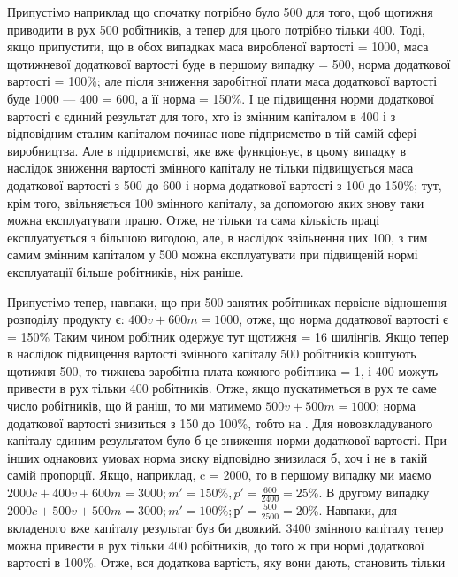 
Припустімо наприклад що спочатку потрібно було 500 для того, щоб щотижня приводити в рух 500 робітників, а тепер для цього потрібно тільки
400.
Тоді, якщо припустити, що в обох випадках маса виробленої
вартості = 1000, маса щотижневої додаткової вартості буде в першому випадку = 500, норма додаткової вартості  = 100\%; але після зниження заробітної плати
маса додаткової вартості буде 1000 — 400 = 600, а її норма  = 150\%. І це підвищення норми додаткової вартості є єдиний результат
для того, хто із змінним капіталом в 400 і з відповідним сталим капіталом починає
нове підприємство в тій самій сфері виробництва. Але в підприємстві, яке вже функціонує, в цьому
випадку в наслідок зниження вартості змінного
капіталу не тільки підвищується маса додаткової вартості з 500
до 600 і норма додаткової вартості з 100
до 150\%; тут, крім того, звільняється 100
змінного капіталу, за допомогою яких знову таки можна експлуатувати працю. Отже, не тільки та сама
кількість праці експлуатується з більшою вигодою, але, в наслідок звільнення цих 100, з тим самим змінним капіталом у 500 можна експлуатувати при підвищеній
нормі експлуатації більше робітників, ніж раніше.

Припустімо тепер, навпаки, що при 500 занятих робітниках
первісне відношення розподілу продукту є: $400 v + 600 m = 1000$, отже, що норма додаткової вартості є
= 150\% Таким
чином робітник одержує тут щотижня  = 16 шилінгів. Якщо тепер в наслідок
підвищення вартості
змінного капіталу 500 робітників коштують щотижня 500, то тижнева заробітна плата кожного робітника = 1, і 400 можуть привести
в рух тільки 400 робітників. Отже, якщо пускатиметься в рух те
саме число робітників, що й раніш, то ми матимемо $500 v + 500 m = 1000$; норма додаткової вартості
знизиться з 150 до 100\%,
тобто на . Для нововкладуваного капіталу єдиним результатом було б це зниження норми додаткової
вартості. При інших
однакових умовах норма зиску відповідно знизилася б, хоч і не
в такій самій пропорції. Якщо, наприклад, c = 2000, то в
першому випадку ми маємо $2000 c + 400 v + 600 m = 3000; m' = 150\%, p' = \frac{600}{2400} = 25\%$. В другому
випадку $2000 c + 500 v + 500 m = 3000; m' = 100\%; р' = \frac{500}{2500} = 20\%$. Навпаки, для вкладеного вже
капіталу результат був би двоякий. 3400 змінного капіталу тепер можна привести в рух тільки
400 робітників, до того ж при нормі додаткової вартості в 100\%.
Отже, вся додаткова вартість, яку вони дають, становить тільки
\parbreak{}  %
